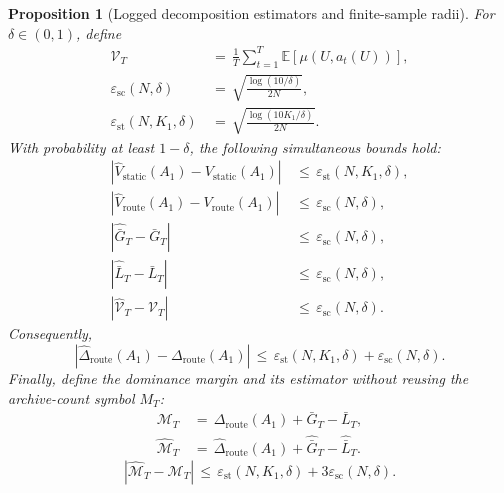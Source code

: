 \documentclass{article} %
\newtheorem{proposition}[theorem]{Proposition}
\begin{document}
\begin{proposition}[Logged decomposition estimators and finite-sample radii]
For \(\delta\in(0,1)\), define
\begin{align}
\label{eq:app-six-pop-value}
\mathcal{V}_T
&\,=\,
\frac{1}{T}\sum_{t=1}^{T}\mathbb{E}[\mu(U,a_t(U))],
\\
\label{eq:app-six-scalar-radius}
\varepsilon_{\mathrm{sc}}(N,\delta)
&\,=\,
\sqrt{\frac{\log(10/\delta)}{2N}},
\\
\label{eq:app-six-static-radius}
\varepsilon_{\mathrm{st}}(N,K_1,\delta)
&\,=\,
\sqrt{\frac{\log(10K_1/\delta)}{2N}}.
\end{align}
With probability at least \(1-\delta\), the following simultaneous bounds hold:
\begin{equation}
\label{eq:app-six-estimator-bounds}
\begin{aligned}
\left|
\widehat V_{\mathrm{static}}(A_1)-V_{\mathrm{static}}(A_1)
\right|
&\,\le\,
\varepsilon_{\mathrm{st}}(N,K_1,\delta),
\\
\left|
\widehat V_{\mathrm{route}}(A_1)-V_{\mathrm{route}}(A_1)
\right|
&\,\le\,
\varepsilon_{\mathrm{sc}}(N,\delta),
\\
\left|
\widehat{\bar G}_T-\bar G_T
\right|
&\,\le\,
\varepsilon_{\mathrm{sc}}(N,\delta),
\\
\left|
\widehat{\bar L}_T-\bar L_T
\right|
&\,\le\,
\varepsilon_{\mathrm{sc}}(N,\delta),
\\
\left|
\widehat{\mathcal{V}}_T-\mathcal{V}_T
\right|
&\,\le\,
\varepsilon_{\mathrm{sc}}(N,\delta).
\end{aligned}
\end{equation}
Consequently,
\begin{equation}
\label{eq:app-six-delta-radius}
\left|
\widehat\Delta_{\mathrm{route}}(A_1)-\Delta_{\mathrm{route}}(A_1)
\right|
\,\le\,
\varepsilon_{\mathrm{st}}(N,K_1,\delta)
+
\varepsilon_{\mathrm{sc}}(N,\delta).
\end{equation}
Finally, define the dominance margin and its estimator without reusing the
archive-count symbol \(M_T\):
\begin{align}
\label{eq:app-six-margin-pop}
\mathcal M_T
&\,=\,
\Delta_{\mathrm{route}}(A_1)+\bar G_T-\bar L_T,
\\
\label{eq:app-six-margin-hat}
\widehat{\mathcal M}_T
&\,=\,
\widehat\Delta_{\mathrm{route}}(A_1)
+
\widehat{\bar G}_T
-
\widehat{\bar L}_T.
\end{align}
\begin{equation}
\label{eq:app-six-margin-radius}
|\widehat{\mathcal M}_T-\mathcal M_T|
\,\le\,
\varepsilon_{\mathrm{st}}(N,K_1,\delta)
+
3\varepsilon_{\mathrm{sc}}(N,\delta).
\end{equation}
\end{proposition}
\end{document}
